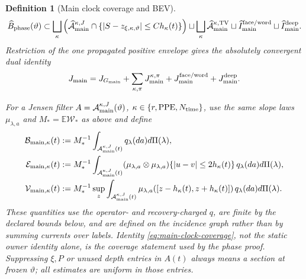 \documentclass[11pt]{article}
\newtheorem{definition}[theorem]{Definition}
\begin{document}
\begin{definition}[Main clock coverage and BEV]
\begin{equation}
\label{eq:main-phase-bad-coverage}
 \widehat B_{\rm phase}(\vartheta)
 \subset
 \bigsqcup_{\kappa}
   \left(\widehat{\mathcal A}_{\rm main}^{\kappa,J}
       \cap\{|S-z_{\xi,\kappa,\vartheta}|\le Ch_\kappa(t)\}\right)
 \sqcup\bigsqcup_{\kappa}
   \widehat{\mathcal A}_{\rm main}^{\kappa,\rm TV}
 \sqcup\widehat I_{\rm main}^{\rm face/word}
 \sqcup\widehat I_{\rm main}^{\rm deep}.
\end{equation}
Restriction of the one propagated positive envelope gives the absolutely
convergent dual identity
\begin{equation}
\label{eq:main-clock-current-identity}
 J_{\rm main}=J_{G_{\rm main}}
 +\sum_{\kappa,\pi}J_{\rm main}^{\kappa,\pi}
 +J_{\rm main}^{\rm face/word}+J_{\rm main}^{\rm deep}.
\end{equation}

For a Jensen filter $A=\mathcal A_{\rm main}^{\kappa,J}(\vartheta)$,
$\kappa\in\{r,{\rm PPE},N_{\rm time}\}$, use the same slope laws
$\mu_{\lambda,a}$ and $M_*=\mathbb E\mathscr W_*$ as above and define
\begin{align}
 \mathcal B_{{\rm main},\kappa}(t)&:=M_*^{-1}
  \int_{\mathcal A_{\rm main}^{\kappa,J}(t)}q_\lambda(da)d\Pi(\lambda),
  \notag\\
 \mathcal E_{{\rm main},\kappa}(t)&:=M_*^{-1}
  \int_{\mathcal A_{\rm main}^{\kappa,J}(t)}
  (\mu_{\lambda,a}\otimes\mu_{\lambda,a})
  \{|u-v|\le2h_\kappa(t)\}\,q_\lambda(da)d\Pi(\lambda),
  \notag\\
 \mathcal V_{{\rm main},\kappa}(t)&:=M_*^{-1}\sup_z
  \int_{\mathcal A_{\rm main}^{\kappa,J}(t)}
  \mu_{\lambda,a}([z-h_\kappa(t),z+h_\kappa(t)])
  \,q_\lambda(da)d\Pi(\lambda).
 \label{eq:main-source-BEV}
\end{align}
These quantities use the operator- and recovery-charged $q$, are finite by
the declared bounds below, and are defined on the incidence graph rather
than by summing currents over labels.  Identity
\eqref{eq:main-clock-coverage}, not the static owner identity alone, is the
coverage statement used by the phase proof.  Suppressing $\xi,P$ or unused
depth entries in $A(t)$ always means a section at frozen $\vartheta$; all
estimates are uniform in those entries.
\end{definition}
\end{document}
